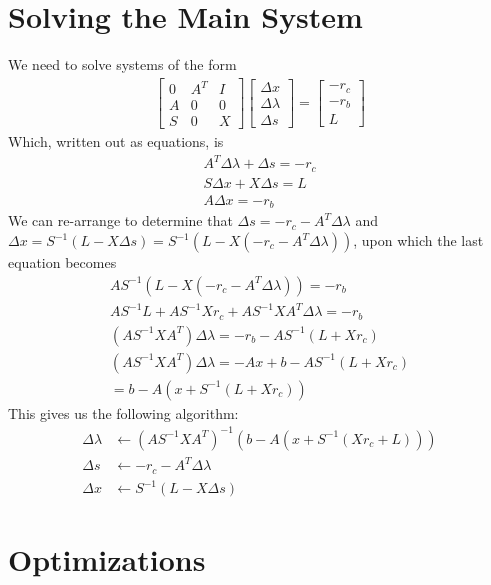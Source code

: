 \documentclass{article}
\begin{document}
\section{Solving the Main System}

We need to solve systems of the form
\begin{align}
		\begin{bmatrix}
				0 & A^T & I\\
				A & 0   & 0\\
				S & 0   & X
		\end{bmatrix}
		\begin{bmatrix}
				\Delta x\\
				\Delta \lambda\\
				\Delta s
		\end{bmatrix} 
		= 
		\begin{bmatrix}
				-r_c\\
				-r_b\\
				L
		\end{bmatrix}
\end{align}
Which, written out as equations, is
\begin{align}
		A^T\Delta \lambda + \Delta s = -r_c\\
		S\Delta x + X\Delta s = L\\
		A\Delta x = -r_b
\end{align}
We can re-arrange to determine that $\Delta s = -r_c - A^T\Delta \lambda$ and $\Delta x = S^{-1}(L - X\Delta s) = S^{-1}(L - X(-r_c - A^T\Delta \lambda))$, upon which the last equation becomes
\begin{align}
		AS^{-1}(L - X(-r_c - A^T\Delta \lambda)) = -r_b\\
		AS^{-1}L + AS^{-1}Xr_c + AS^{-1}XA^T\Delta \lambda = -r_b\\
		(AS^{-1}XA^T) \Delta \lambda = -r_b - AS^{-1}(L + Xr_c)\\
		(AS^{-1}XA^T) \Delta \lambda = -Ax + b - AS^{-1}(L + Xr_c)\\
		= b - A(x + S^{-1}(L + Xr_c))
\end{align}
This gives us the following algorithm:
\begin{align}
	\Delta \lambda &\leftarrow (AS^{-1}XA^T)^{-1}(b-A(x + S^{-1}(Xr_c + L)))\\
	\Delta s &\leftarrow -r_c - A^T\Delta \lambda\\
	\Delta x &\leftarrow S^{-1}(L - X\Delta s)
\end{align}

\section{Optimizations}
\end{document}
